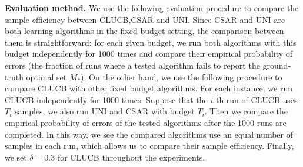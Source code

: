 \documentclass{article}
\newcommand{\Algorithm}{{\small \textsf{CLUCB}}\xspace}
\newcommand{\AlgorithmBud}{{\small \textsf{CSAR}}\xspace}
\newcommand{\Uniform}{{\small \textsf{UNI}}\xspace}
\begin{document}
\textbf{Evaluation method.} 
We use the following evaluation procedure to compare the sample efficiency between \Algorithm,\AlgorithmBud and \Uniform.
Since \AlgorithmBud and \Uniform are both learning algorithms in the fixed budget setting, the comparison between them is straightforward:
for each given budget, we run both algorithms with this budget independently for 1000 times and compare their empirical probability of errors (the fraction of runs where a tested algorithm fails to report the ground-truth optimal set $M_*$).
On the other hand, we use the following procedure to compare \Algorithm with other fixed budget algorithms.
For each instance, we run \Algorithm independently for 1000 times.
Suppose that the $i$-th run of \Algorithm uses $T_i$ samples, we also run \Uniform and \AlgorithmBud with budget $T_i$.
Then we compare the empirical probability of errors of the tested algorithms after the 1000 runs are completed.
In this way, we see the compared algorithms use an equal number of samples in each run, which allows us to compare their sample efficiency.
Finally, we set $\delta=0.3$ for \Algorithm throughout the experiments.
\end{document}
